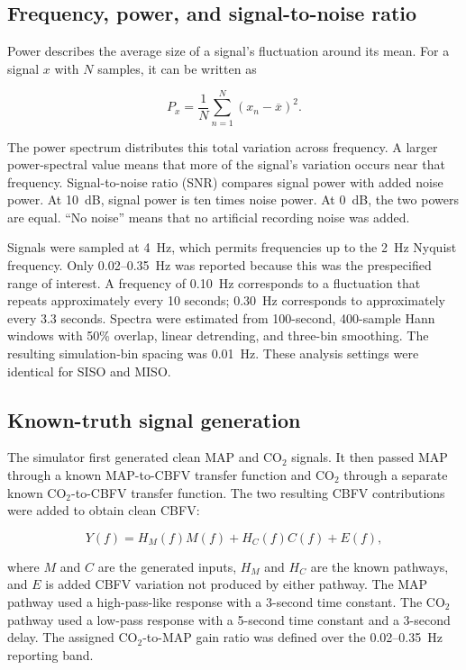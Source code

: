 \documentclass[12pt]{article}
\begin{document}
\subsection{Frequency, power, and signal-to-noise ratio}

Power describes the average size of a signal's fluctuation around its mean. For
a signal $x$ with $N$ samples, it can be written as

\begin{equation}
P_x=\frac{1}{N}\sum_{n=1}^{N}\left(x_n-\overline{x}\right)^2.
\label{eq:power}
\end{equation}

The power spectrum distributes this total variation across frequency. A larger
power-spectral value means that more of the signal's variation occurs near that
frequency. Signal-to-noise ratio (SNR) compares signal power with added noise
power. At 10~dB, signal power is ten times noise power. At 0~dB, the two powers
are equal. ``No noise'' means that no artificial recording noise was added.

Signals were sampled at 4~Hz, which permits frequencies up to the 2~Hz Nyquist
frequency. Only 0.02--0.35~Hz was reported because this was the prespecified
range of interest. A frequency of 0.10~Hz corresponds to a fluctuation that
repeats approximately every 10 seconds; 0.30~Hz corresponds to approximately
every 3.3 seconds. Spectra were estimated from 100-second, 400-sample Hann
windows with 50\% overlap, linear detrending, and three-bin smoothing. The
resulting simulation-bin spacing was 0.01~Hz. These analysis settings were
identical for SISO and MISO.

\subsection{Known-truth signal generation}

The simulator first generated clean MAP and CO$_2$ signals. It then passed MAP
through a known MAP-to-CBFV transfer function and CO$_2$ through a separate
known CO$_2$-to-CBFV transfer function. The two resulting CBFV contributions
were added to obtain clean CBFV:

\begin{equation}
    Y(f) = H_M(f)M(f) + H_C(f)C(f) + E(f),
    \label{eq:generator}
\end{equation}

where $M$ and $C$ are the generated inputs, $H_M$ and $H_C$ are the known
pathways, and $E$ is added CBFV variation not produced by either pathway. The
MAP pathway used a high-pass-like response with a 3-second time constant. The
CO$_2$ pathway used a low-pass response with a 5-second time constant and a
3-second delay. The assigned CO$_2$-to-MAP gain ratio was defined over the
0.02--0.35~Hz reporting band.
\end{document}
